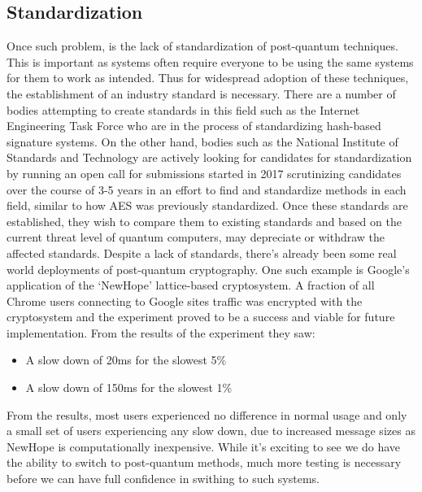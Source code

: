 \documentclass[10pt,a4paper]{article}
\begin{document}
\subsection{Standardization}
 Once such problem, is the lack of standardization of post-quantum techniques. This is important as systems often require everyone to be using the same systems for them to work as intended. Thus for widespread adoption of these techniques, the establishment of  an industry standard is necessary. There are a number of bodies attempting to create standards in this field such as the Internet Engineering Task Force who are in the process of standardizing hash-based signature systems. On the other hand, bodies such as the National Institute of Standards and Technology are actively looking for candidates for standardization by running an open call for submissions started in 2017 scrutinizing candidates over the course of 3-5 years in an effort to find and standardize methods in each field, similar to how AES was previously standardized. Once these standards are established, they wish to compare them to existing standards and based on the current threat level of quantum computers, may depreciate or withdraw the affected standards. 
\newline
Despite a lack of standards, there's already been some real world deployments of post-quantum cryptography. One such example is Google's application of the `NewHope' lattice-based cryptosystem. A fraction of all Chrome users connecting to Google sites traffic was encrypted with the cryptosystem and the experiment proved to be a success and viable for future implementation. From the results of the experiment they saw: %
\begin{itemize}
\item A slow down of 20ms for the slowest 5\% 
\item A slow down of 150ms for the slowest 1\%
\end{itemize}
From the results, most users experienced no difference in normal usage and only a small set of users experiencing any slow down, due to increased message sizes as NewHope is computationally inexpensive.
\newline
While it's exciting to see we do have the ability to switch to post-quantum methods, much more testing is necessary before we can have full confidence in swithing to such systems. 
\end{document}
